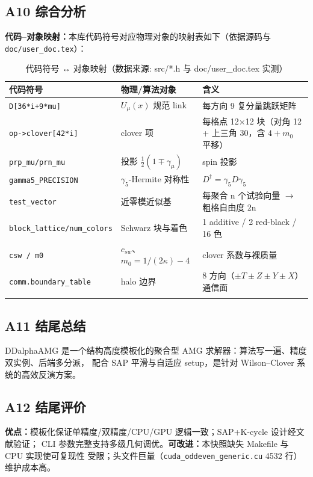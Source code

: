 \documentclass[UTF8]{ctexart}
\begin{document}
\subsection{A10 综合分析}
\textbf{代码--对象映射：}本库代码符号对应物理对象的映射表如下（依据源码与
\texttt{doc/user\_doc.tex}）：
\begin{xltabular}{\textwidth}{llX}
\toprule
\textcolor{struct}{代码符号} & 物理/算法对象 & 含义 \\
\midrule
\endhead
\texttt{D[36*i+9*mu]} & $U_\mu(x)$ 规范 link & 每方向 9 复分量跳跃矩阵 \\
\texttt{op->clover[42*i]} & clover 项 & 每格点 12×12 块（对角 12 + 上三角 30，含 $4+m_0$ 平移）\\
\texttt{prp\_mu/prn\_mu} & 投影 $\tfrac12(1\mp\gamma_\mu)$ & spin 投影 \\
\texttt{gamma5\_PRECISION} & $\gamma_5$-Hermite 对称性 & $D^\dagger=\gamma_5D\gamma_5$\\
\texttt{test\_vector} & 近零模近似基 & 每聚合 n 个试验向量 $\rightarrow$ 粗格自由度 2n \\
\texttt{block\_lattice/num\_colors} & Schwarz 块与着色 & 1 additive / 2 red-black / 16 色 \\
\texttt{csw / m0} & $c_{sw}$、$m_0=1/(2\kappa)-4$ & clover 系数与裸质量 \\
\texttt{comm.boundary\_table} & halo 边界 & 8 方向（$\pm T\pm Z\pm Y\pm X$）通信面 \\
\bottomrule
\caption{代码符号 ↔ 对象映射（数据来源: src/*.h 与 doc/user_doc.tex 实测）}
\end{xltabular}

\subsection{A11 结尾总结}
\begin{conclbox}
DDalphaAMG 是一个结构高度模板化的聚合型 AMG 求解器：算法写一遍、精度双实例、后端多分派，
配合 SAP 平滑与自适应 setup，是针对 Wilson--Clover 系统的高效反演方案。
\end{conclbox}

\subsection{A12 结尾评价}
\textbf{优点：}模板化保证单精度/双精度/CPU/GPU 逻辑一致；SAP+K-cycle 设计经文献验证；
CLI 参数完整支持多级几何调优。\textbf{可改进：}本快照缺失 Makefile 与 CPU 实现使可复现性
受限；头文件巨量（\texttt{cuda\_oddeven\_generic.cu} 4532 行）维护成本高。
\end{document}
